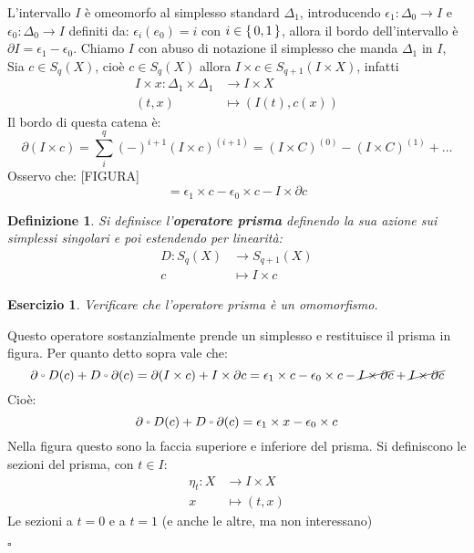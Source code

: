 \documentclass[10pt, twoside=false, x11names]{scrbook}
\newtheorem{definition}[theorem]{Definizione}
\newcounter{exercises}
\newtheorem{exercise}[exercises]{Esercizio}
\newenvironment{proof}{{\textbf{Dimostrazione}:}}{\hfill $\square$}
\let\latexcirc=\circ
\newcommand{\ccirc}{\mathbin{\mathchoice
  {\xcirc\scriptstyle}
  {\xcirc\scriptstyle}
  {\xcirc\scriptscriptstyle}
  {\xcirc\scriptscriptstyle}
}}
\newcommand{\xcirc}[1]{\vcenter{\hbox{$#1\latexcirc$}}}
\let\circ\ccirc
\begin{document}
\begin{proof}
  L'intervallo $ I $ è omeomorfo al simplesso standard $ \Delta_1 $, introducendo
  $ \epsilon_1 \colon \Delta_0 \to I $ e $ \epsilon_0 \colon \Delta_0 \to I $ definiti da:
  $ \epsilon_i(e_0) = i $ con $ i \in \set{0,1} $, allora il bordo dell'intervallo è
  $ \partial I = \epsilon_1 - \epsilon_0 $. Chiamo $ I $ con abuso di notazione il simplesso che
  manda $ \Delta_1 $ in $ I $, Sia $ c \in S_q(X) $, cioè $ c \in S_q(X) $
  allora $ I \times c \in S_{q+1}(I \times X) $, infatti
  \begin{align*}
    I \times x \colon \Delta_1 \times \Delta_1 & \to I \times X \\
    (t,x) & \mapsto (I(t), c(x))
  \end{align*}
  Il bordo di questa catena è:
  \[
    \partial (I \times c) = \sum_i^{q} (-)^{i+1}(I \times c)^{(i+1)} = (I \times C)^{(0)} - (I \times C)^{(1)} + \dots
  \]
  Osservo che:
  [FIGURA]
  \[
    = \epsilon_1 \times c - \epsilon_0 \times c - I \times \partial c
  \]
  \begin{definition}
    Si definisce l'\textbf{operatore prisma} definendo
    la sua azione sui simplessi singolari e poi estendendo per linearità:
    \begin{align*}
      D \colon S_q(X) & \to S_{q+1}(X) \\
      c & \mapsto I \times c
    \end{align*}
  \end{definition}
  \begin{exercise}
    Verificare che l'operatore prisma è un omomorfismo.
  \end{exercise}
  Questo operatore sostanzialmente prende un simplesso e restituisce il prisma
  in figura.
  Per quanto detto sopra vale che:
  \[
    \partial \circ D (c) + D \circ \partial (c) = \partial (I \times c) + I \times \partial c = \epsilon_1 \times c - \epsilon_0 \times c - \cancel{I \times \partial c}
    + \cancel{I \times \partial c}
  \]
  Cioè:
  \[
    \partial \circ D (c) + D \circ \partial (c) = \epsilon_1 \times x - \epsilon_0 \times c
  \]
  Nella figura questo sono la faccia superiore e inferiore del prisma.
  Si definiscono le sezioni del prisma, con $ t \in I $:
  \begin{align*}
    \eta_t  \colon X & \to I \times X \\
    x & \mapsto (t,x)
  \end{align*}
  Le sezioni a $ t = 0 $ e a $ t = 1 $ (e anche le altre, ma non interessano)

\end{proof}
\end{document}
